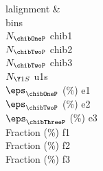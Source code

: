 \begin{tabu}{l{{alignment}}}
&  \\
{{bins}} \\
\hline
$N_{\chibOneP}$ {{chib1}} \\
$N_{\chibTwoP}$ {{chib2}} \\
$N_{\chibTwoP}$ {{chib3}} \\
$N_{\Y1S}$ {{u1s}} \\
$\eps_{\chibOneP}$ (\%) {{e1}} \\
$\eps_{\chibTwoP}$ (\%) {{e2}} \\
$\eps_{\chibThreeP}$ (\%) {{e3}} \\
Fraction \chibOneP (\%) {{f1}} \\
Fraction \chibTwoP (\%) {{f2}} \\
Fraction \chibThreeP (\%) {{f3}} \\
\end{tabu}